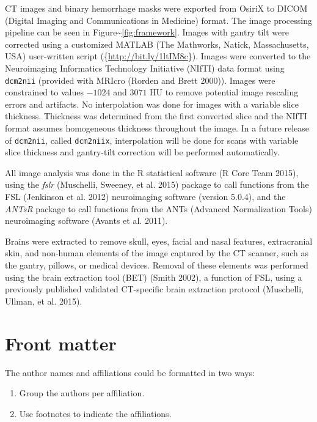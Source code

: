 \documentclass[]{elsarticle} %
\begin{document}
CT images and binary hemorrhage masks were exported from OsiriX to DICOM
(Digital Imaging and Communications in Medicine) format. The image
processing pipeline can be seen in
Figure\textasciitilde{}\ref{fig:framework}. Images with gantry tilt were
corrected using a customized MATLAB (The Mathworks, Natick,
Massachusetts, USA) user-written script
(\{\scriptsize \url{http://bit.ly/1ltIM8c}\}). Images were converted to
the Neuroimaging Informatics Technology Initiative (NIfTI) data format
using \texttt{dcm2nii} (provided with MRIcro (Rorden and Brett 2000)).
Images were constrained to values \(-1024\) and \(3071\) HU to remove
potential image rescaling errors and artifacts. No interpolation was
done for images with a variable slice thickness. Thickness was
determined from the first converted slice and the NIfTI format assumes
homogeneous thickness throughout the image. In a future release of
\texttt{dcm2nii}, called \texttt{dcm2niix}, interpolation will be done
for scans with variable slice thickness and gantry-tilt correction will
be performed automatically.

All image analysis was done in the R statistical software (R Core Team
2015), using the \emph{fslr} (Muschelli, Sweeney, et al. 2015) package
to call functions from the FSL (Jenkinson et al. 2012) neuroimaging
software (version 5.0.4), and the \emph{ANTsR} package to call functions
from the ANTs (Advanced Normalization Tools) neuroimaging software
(Avants et al. 2011).

Brains were extracted to remove skull, eyes, facial and nasal features,
extracranial skin, and non-human elements of the image captured by the
CT scanner, such as the gantry, pillows, or medical devices. Removal of
these elements was performed using the brain extraction tool (BET)
(Smith 2002), a function of FSL, using a previously published validated
CT-specific brain extraction protocol (Muschelli, Ullman, et al. 2015).

\hypertarget{front-matter}{%
\section{Front matter}\label{front-matter}}

The author names and affiliations could be formatted in two ways:

\begin{enumerate}
\def\labelenumi{(\arabic{enumi})}
\item
  Group the authors per affiliation.
\item
  Use footnotes to indicate the affiliations.
\end{enumerate}
\end{document}
